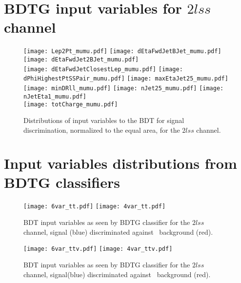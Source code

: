\section{BDTG input variables for $2lss$ channel }

\begin{figure} [!h]
  \centering
  \texttt{[image: Lep2Pt\_mumu.pdf]}
  \texttt{[image: dEtaFwdJetBJet\_mumu.pdf]}
  \texttt{[image: dEtaFwdJet2BJet\_mumu.pdf]}\\
  \texttt{[image: dEtaFwdJetClosestLep\_mumu.pdf]}
  \texttt{[image: dPhiHighestPtSSPair\_mumu.pdf]}
  \texttt{[image: maxEtaJet25\_mumu.pdf]}\\
  \texttt{[image: minDRll\_mumu.pdf]}
  \texttt{[image: nJet25\_mumu.pdf]}
  \texttt{[image: nJetEta1\_mumu.pdf]}\\
  \texttt{[image: totCharge\_mumu.pdf]}
  \caption[Input variables to the BDT, $2lss$ channel]{Distributions of input variables to the BDT for signal discrimination, normalized to the equal area, for the $2lss$ channel.}
  \label{fig:input_vars_2lss}
\end{figure}  

\newpage

\section{Input variables distributions from BDTG classifiers}

\begin{figure} [!h]
  \centering
  \texttt{[image: 6var\_tt.pdf]}
  \texttt{[image: 4var\_tt.pdf]}
  \caption[BDT input variables. Discrimination against \ttbar\ in $2lss$ channel.]{BDT input variables as seen by BDTG classifier for the $2lss$ channel, \tHq signal (blue) discriminated against \ttbar\ background (red).}
  \label{mva_input_2lss_tt}
\end{figure}

\begin{figure} [!h]
  \centering
  \texttt{[image: 6var\_ttv.pdf]}
  \texttt{[image: 4var\_ttv.pdf]}
  \caption[BDT input variables. Discrimination against \ttV\ in $2lss$ channel.]{BDT input variables as seen by BDTG classifier for the $2lss$ channel, \tHq signal(blue) discriminated against \ttV\ background (red).}
  \label{mva_input_2lss_ttv}
\end{figure}

